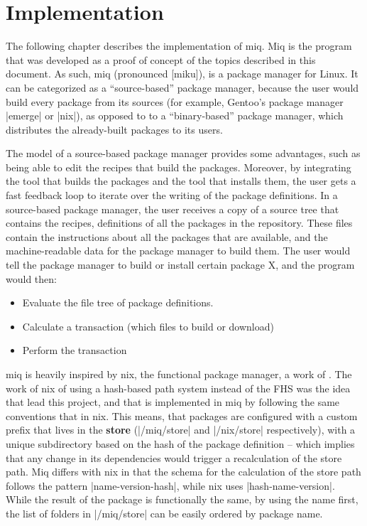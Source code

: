 \FloatBarrier
\chapter{Implementation}

The following chapter describes the implementation of miq.
Miq is the program that was developed as a proof of concept
of the topics described in this document. As such, miq
(pronounced [miku]), is a package manager for Linux. It can
be categorized as a ``source-based'' package manager,
because the user would build every package from its sources
(for example, Gentoo's package manager |emerge| or |nix|),
as opposed to to a ``binary-based'' package manager, which
distributes the already-built packages to its users.

The model of a source-based package manager provides some
advantages, such as being able to edit the recipes that
build the packages. Moreover, by integrating the tool that
builds the packages and the tool that installs them, the
user gets a fast feedback loop to iterate over the writing
of the package definitions. In a source-based package
manager, the user receives a copy of a source tree that
contains the recipes, definitions of all the packages in the
repository. These files contain the instructions about all
the packages that are available, and the machine-readable
data for the package manager to build them. The user would
tell the package manager to build or install certain package
X, and the program would then:

\begin{itemize}
    \item Evaluate the file tree of package definitions.
    \item Calculate a transaction (which files to build or download)
    \item Perform the transaction
\end{itemize}


miq is heavily inspired by nix, the functional package
manager, a work of 
\cite{dolstraNixOS2008}. The work of nix of using a
hash-based path system instead of the \ac{FHS} was the idea
that lead this project, and that is implemented in miq by
following the same conventions that in nix. This means, that
packages are configured with a custom prefix that lives in
the \textbf{store} (|/miq/store| and |/nix/store| respectively), with
a unique subdirectory based on the hash of the package
definition -- which implies that any change in its
dependencies would trigger a recalculation of the store
path. Miq differs with nix in that the schema for the
calculation of the store path follows the pattern
|name-version-hash|, while nix uses |hash-name-version|.
While the result of the package is functionally the same, by
using the name first, the list of folders in |/miq/store|
can be easily ordered by package name.

